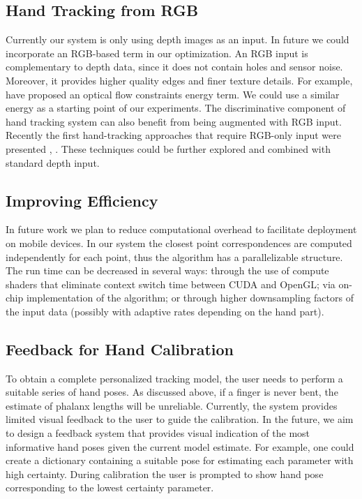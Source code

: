 \subsection*{Hand Tracking from RGB}
Currently our system is only using depth images as an input. In future we could incorporate an RGB-based term in our optimization. An RGB input is complementary to depth data, since it does not contain holes and sensor noise. Moreover, it provides higher quality edges and finer texture details. For example, \cite{weise2011realtime} have proposed an optical flow constraints energy term. We could use a similar energy as a starting point of our experiments. The discriminative component of hand tracking system can also benefit from being augmented with RGB input. Recently the first hand-tracking approaches that require RGB-only input were presented \cite{simon2017hand}, \cite{zimmermann2017learning}. These techniques could be further explored and combined with standard depth input.

\subsection*{Improving Efficiency}
In future work we plan to reduce computational overhead to facilitate deployment on mobile devices. In our system the closest point correspondences are computed independently for each point, thus the algorithm has a parallelizable structure. The run time can be decreased in several ways: through the use of compute shaders that eliminate context switch time between CUDA and OpenGL; via on-chip implementation of the algorithm; or through higher downsampling factors of the input data (possibly with adaptive rates depending on the hand part).

\subsection*{Feedback for Hand Calibration}
To obtain a complete personalized tracking model, the user needs to perform a suitable series of hand poses. As discussed above, if a finger is never bent, the estimate of phalanx lengths will be unreliable. Currently, the system provides limited visual feedback to the user to guide the calibration. In the future, we aim to design a feedback system that provides visual indication of the most informative hand poses given the current model estimate. For example, one could create a dictionary containing a suitable pose for estimating each parameter with high certainty. During calibration the user is prompted to show hand pose corresponding to the lowest certainty parameter. 

